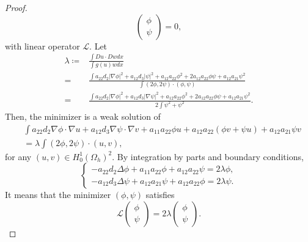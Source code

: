 \documentclass[11pt]{amsart}
\numberwithin{equation}{section}
\theoremstyle{plain}
\theoremstyle{definition}
\begin{document}
\begin{proof}
\begin{equation*}
\begin{pmatrix}
			\phi\\
			\psi
		\end{pmatrix}=0,
	\end{equation*}
	with linear operator $\mathcal{L}$. Let
	\begin{equation*}
	\begin{aligned}
		\lambda \coloneqq &\frac{\int Du\cdot Dw dx}{\int g(u)w dx}\\
		=&\frac{\int a_{22}d_2\lvert \nabla \phi \rvert ^2+a_{12}d_3\lvert \psi \rvert^2 +a_{12}a_{22}\phi^2+2a_{12}a_{22}\phi\psi+a_{12}a_{21}\psi^2}{\int (2\phi,2\psi)\cdot(\phi,\psi)}\\
		=&\frac{\int a_{22}d_2\lvert \nabla \phi \rvert^2+a_{12}d_3\lvert \nabla \psi \rvert^2+a_{12}a_{22}\phi^2+2a_{12}a_{22}\phi\psi+a_{12}a_{21}\psi^2}{2\int \psi^2+\psi^2}.
	\end{aligned}
	\end{equation*}
	Then, the minimizer is a weak solution of
	\begin{equation*}
	\begin{aligned}
		&\int a_{22}d_2 \nabla \phi \cdot \nabla u +a_{12}d_3\nabla \psi \cdot \nabla v +a_{11}a_{22}\phi u+a_{12}a_{22}(\phi v+\psi u)+a_{12}a_{21}\psi v\\
		&=\lambda \int (2\phi,2\psi) \cdot (u,v),
	\end{aligned}
	\end{equation*}
	for any $(u,v)\in H_0^1(\Omega_h)^2$.
	By integration by parts and boundary conditions,
	\begin{equation*}
		\left \{ \begin{aligned}
			-a_{22}d_2\Delta \phi +a_{11}a_{22}\phi +a_{12}a_{22}\psi =2\lambda \phi,\\
			-a_{12}d_3\Delta \psi +a_{12}a_{21}\psi +a_{12}a_{22}\phi =2\lambda \psi.
		\end{aligned} \right.
	\end{equation*}
	It means that the minimizer $(\phi,\psi)$ satisfies
	\begin{equation*}
		\mathcal{L}\begin{pmatrix}
			\phi\\
			\psi
		\end{pmatrix}=2\lambda \begin{pmatrix}
			\phi\\
			\psi
		\end{pmatrix}.
	\end{equation*}
\end{proof}
\end{document}
